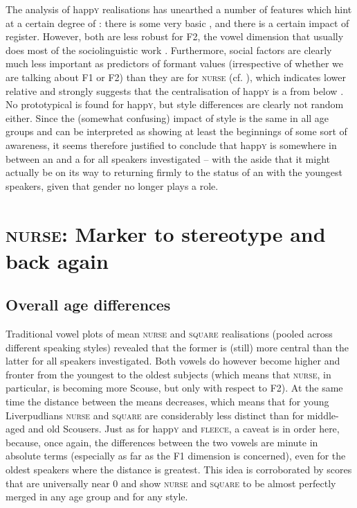 The analysis of happ\textsc{y} realisations has unearthed a number of features which hint at a certain degree of : there is some very basic , and there is a certain impact of register.
However, both are less robust for F2, the vowel dimension that usually does most of the sociolinguistic work \parencite[cf.][502]{labov2006a}.
Furthermore, social factors are clearly much less important as predictors of formant values (irrespective of whether we are talking about F1 or F2) than they are for \textsc{nurse} (cf. ), which indicates lower relative  and strongly suggests that the centralisation of happ\textsc{y} is a  from below \parencite[cf.][78]{labov1994}.
No prototypical  is found for happ\textsc{y}, but style differences are clearly not random either.
Since the (somewhat confusing) impact of style is the same in all age groups and can be interpreted as showing at least the beginnings of some sort of awareness, it seems therefore justified to conclude that happ\textsc{y} is somewhere in between an  and a  for all speakers investigated -- with the aside that it might actually be on its way to returning firmly to the status of an  with the youngest speakers, given that gender no longer plays a role.

\section{\textsc{nurse}: Marker to stereotype and back again}
\label{prod.disc.nurse}

\subsection{Overall age differences}
\label{prod.disc.nurse.age}

Traditional vowel plots of mean \textsc{nurse} and \textsc{square} realisations (pooled across different speaking styles) revealed that the former is (still) more central than the latter for all speakers investigated.
Both vowels do however become higher and fronter from the youngest to the oldest subjects (which means that \textsc{nurse}, in particular, is becoming more Scouse, but only with respect to F2).
At the same time the distance between the means decreases, which means that for young Liverpudlians \textsc{nurse} and \textsc{square} are considerably less distinct than for middle-aged and old Scousers.
Just as for happ\textsc{y} and \textsc{fleece}, a caveat is in order here, because, once again, the differences between the two vowels are minute in absolute terms (especially as far as the F1 dimension is concerned), even for the oldest speakers where the distance is greatest.
This idea is corroborated by  scores that are universally near 0 and show \textsc{nurse} and \textsc{square} to be almost perfectly merged in any age group and for any style.

